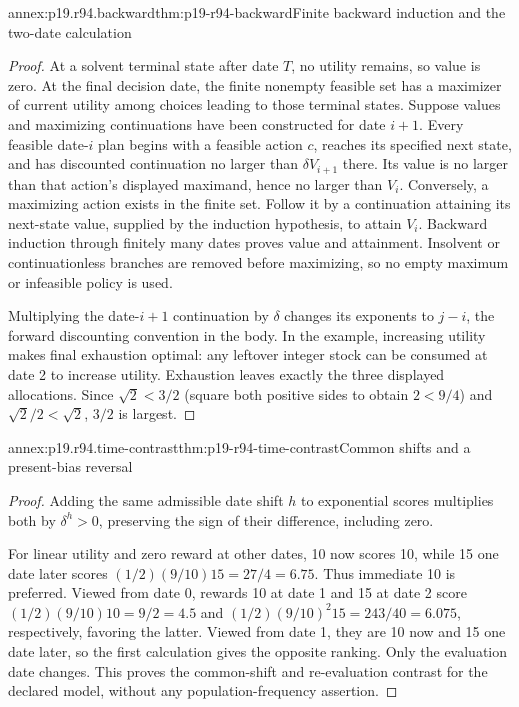 \begin{annexitem}{annex:p19.r94.backward}{thm:p19-r94-backward}{Finite backward induction and the two-date calculation}
\begin{proof}
At a solvent terminal state after date \(T\), no utility remains, so
value is zero. At the final decision date, the finite nonempty feasible
set has a maximizer of current utility among choices leading to those
terminal states. Suppose values and maximizing continuations have been
constructed for date \(i+1\). Every feasible date-\(i\) plan begins
with a feasible action \(c\), reaches its specified next state, and has
discounted continuation no larger than \(\delta V_{i+1}\) there.
Its value is no larger than that action's displayed maximand, hence no
larger than \(V_i\). Conversely, a maximizing action exists in the finite
set. Follow it by a continuation attaining its next-state value, supplied
by the induction hypothesis, to attain \(V_i\). Backward induction
through finitely many dates proves value and attainment. Insolvent or
continuationless branches are removed before maximizing, so no empty
maximum or infeasible policy is used.

Multiplying the date-\(i+1\) continuation by \(\delta\) changes its
exponents to \(j-i\), the forward discounting convention in the body.
In the example, increasing utility makes final exhaustion optimal: any
leftover integer stock can be consumed at date 2 to increase utility.
Exhaustion leaves exactly the three displayed allocations.
Since \(\sqrt2<3/2\) (square both positive sides to obtain
\(2<9/4\)) and \(\sqrt2/2<\sqrt2\), \(3/2\) is largest.
\end{proof}
\end{annexitem}

\begin{annexitem}{annex:p19.r94.time-contrast}{thm:p19-r94-time-contrast}{Common shifts and a present-bias reversal}
\begin{proof}
Adding the same admissible date shift \(h\) to exponential scores
multiplies both by \(\delta^h>0\), preserving the sign of their
difference, including zero.

For linear utility and zero reward at other dates, 10 now scores 10,
while 15 one date later scores \((1/2)(9/10)15=27/4=6.75\).
Thus immediate 10 is preferred. Viewed from date 0, rewards 10 at date 1
and 15 at date 2 score \((1/2)(9/10)10=9/2=4.5\) and
\((1/2)(9/10)^2 15=243/40=6.075\), respectively, favoring the latter.
Viewed from date 1, they are 10 now and 15 one date later, so the first
calculation gives the opposite ranking. Only the evaluation date changes.
This proves the common-shift and re-evaluation contrast for the declared
model, without any population-frequency assertion.
\end{proof}
\end{annexitem}


